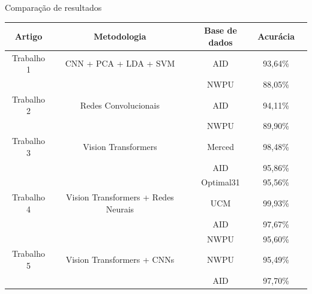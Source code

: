 \begin{frame}{Comparação de resultados}
    \scriptsize %
    \begin{table}
        \centering
        \begin{tabular}{@{}ccccc@{}}
            \toprule
            \textbf{Artigo} & \textbf{Metodologia} & \textbf{Base de dados} & \textbf{Acurácia} \\ \midrule
            Trabalho 1 & CNN + PCA + LDA + SVM & AID  & 93,64\% \\
                      &                        & NWPU & 88,05\% \\ \midrule
            Trabalho 2 & Redes Convolucionais & AID & 94,11\% \\
                      &                       & NWPU & 89,90\% \\ \midrule
            Trabalho 3 & Vision Transformers & Merced  & 98,48\% \\
                      &                      & AID  & 95,86\% \\
                      &                      & Optimal31 & 95,56\% \\  \midrule
            Trabalho 4 & Vision Transformers + Redes Neurais & UCM  & 99,93\% \\
                      &                                      & AID  & 97,67\% \\
                      &                                      & NWPU & 95,60\% \\  \midrule
            Trabalho 5 & Vision Transformers + CNNs & NWPU & 95,49\% \\
                      &                             & AID & 97,70\% \\ \bottomrule
        \end{tabular}
    \end{table}
\end{frame}
